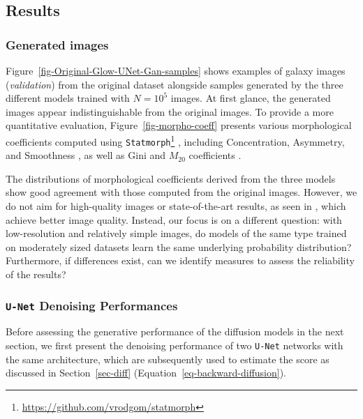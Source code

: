 \documentclass[fleqn,usenatbib]{mnras}
\begin{document}
%
\subsection{Results}
\label{sec-Results}
%
\subsubsection{Generated images}
\label{sec-Generated-Images}
%
Figure~\ref{fig-Original-Glow-UNet-Gan-samples} shows examples of galaxy images (\textit{validation}) from the original dataset alongside samples generated by the three different models trained with $N = 10^5$ images.
%
%
At first glance, the generated images appear indistinguishable from the original images. To provide a more quantitative evaluation, Figure~\ref{fig-morpho-coeff} presents various morphological coefficients computed using \texttt{Statmorph}\footnote{\url{https://github.com/vrodgom/statmorph}} \citep{2019MNRAS.483.4140R}, including Concentration, Asymmetry, and Smoothness \citep{2000AJ....119.2645B,2003ApJS..147....1C,2004AJ....128..163L}, as well as Gini and $M_{20}$ coefficients \citep{2004AJ....128..163L,10.1093/mnras/stv2078}.



The distributions of morphological coefficients derived from the three models show good agreement with those computed from the original images. However, we do not aim for high-quality images or state-of-the-art results, as seen in \citep{ravanbakhsh2016, Fussell2019, Lanusse2021, smith2021, HACKSTEIN2023100685}, which achieve better image quality. Instead, our focus is on a different question: with low-resolution and relatively simple images, do models of the same type trained on moderately sized datasets learn the same underlying probability distribution? Furthermore, if differences exist, can we identify measures to assess the reliability of the results?
%
\subsubsection{\texttt{U-Net} Denoising Performances}
\label{sec-UNet-Perf}
%
{\color{red} Before assessing the generative performance of the diffusion models in the next section, we first present the denoising performance of two \texttt{U-Net} networks with the same architecture, which are subsequently used to estimate the score as discussed in Section~\ref{sec-diff} (Equation~\ref{eq-backward-diffusion}).
}
\end{document}

